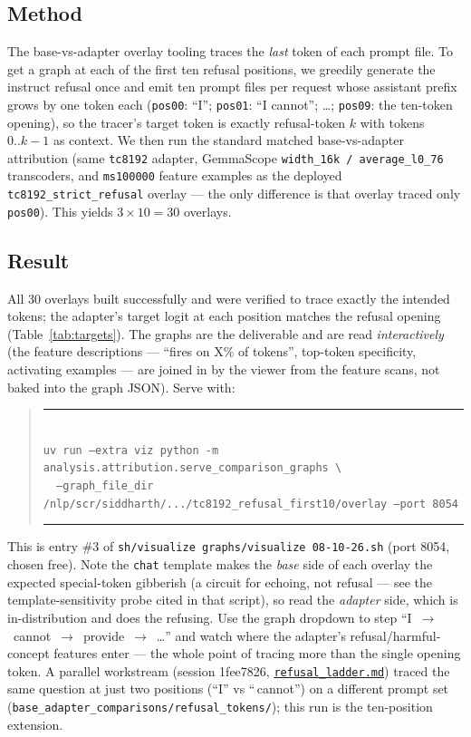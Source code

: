 \documentclass[11pt]{article}
\newenvironment{cbox}{\begin{quote}\small\begin{minipage}{0.95\linewidth}\rule{\linewidth}{0.4pt}\\}{\\\rule{\linewidth}{0.4pt}\end{minipage}\end{quote}}
\newcommand{\code}[1]{\texttt{\small #1}}
\newcommand{\pos}[1]{\texttt{pos#1}}
\begin{document}
\subsection{Method}
The base-vs-adapter overlay tooling traces the \emph{last} token of each prompt file. To get a graph at each of the first ten refusal positions, we greedily generate the instruct refusal once and emit ten prompt files per request whose assistant prefix grows by one token each (\pos{00}: ``I''; \pos{01}: ``I cannot''; \ldots; \pos{09}: the ten-token opening), so the tracer's target token is exactly refusal-token $k$ with tokens $0..k{-}1$ as context. We then run the standard matched base-vs-adapter attribution (same \code{tc8192} adapter, GemmaScope \code{width\_16k / average\_l0\_76} transcoders, and \code{ms100000} feature examples as the deployed \code{tc8192\_strict\_refusal} overlay --- the only difference is that overlay traced only \pos{00}). This yields $3\times 10 = 30$ overlays.

\subsection{Result}
All 30 overlays built successfully and were verified to trace exactly the intended tokens; the adapter's target logit at each position matches the refusal opening (Table~\ref{tab:targets}). The graphs are the deliverable and are read \emph{interactively} (the feature descriptions --- ``fires on X\% of tokens'', top-token specificity, activating examples --- are joined in by the viewer from the feature scans, not baked into the graph JSON). Serve with:
\begin{cbox}
\code{uv run --extra viz python -m analysis.attribution.serve\_comparison\_graphs \textbackslash}\\
\code{\ \ --graph\_file\_dir /nlp/scr/siddharth/.../tc8192\_refusal\_first10/overlay --port 8054}
\end{cbox}
This is entry \#3 of \code{sh/visualize graphs/visualize 08-10-26.sh} (port 8054, chosen free). Note the \code{chat} template makes the \emph{base} side of each overlay the expected special-token gibberish (a circuit for echoing, not refusal --- see the template-sensitivity probe cited in that script), so read the \emph{adapter} side, which is in-distribution and does the refusing. Use the graph dropdown to step ``I~$\to$~cannot~$\to$~provide~$\to$~\ldots'' and watch where the adapter's refusal/harmful-concept features enter --- the whole point of tracing more than the single opening token. A parallel workstream (session 1fee7826, \href{run:../refusal_ladder.md}{\code{refusal\_ladder.md}}) traced the same question at just two positions (``I'' vs ``\,cannot'') on a different prompt set (\code{base\_adapter\_comparisons/refusal\_tokens/}); this run is the ten-position extension.
\end{document}
